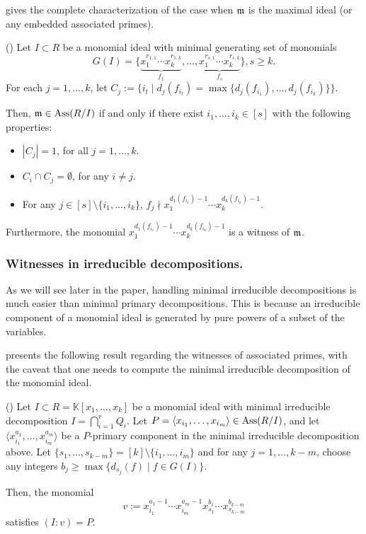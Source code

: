 \documentclass[11pt]{amsart}   %
\begin{document}
\cite[Theorem 2.7 and proof of Theorem 2.3]{NaRa} gives the complete characterization of the case when $\frak m$ is the maximal ideal (or any embedded associated primes).        

\begin{thm}\label{thm_M_assoc} {\rm (\cite[Theorem 2.7, proof of Theorem 2.3]{NaRa})} Let $I\subset R$ be a monomial ideal with minimal generating set of monomials $$G(I)=\{\underbrace{x_1^{r_{1,1}}\cdots x_k^{r_{1,k}}}_{f_1},\ldots,\underbrace{x_1^{r_{s,1}}\cdots x_k^{r_{s,k}}}_{f_s}\}, s\geq k.$$ For each $j=1,\ldots,k$, let $C_j:=\{i_t\mid d_j(f_{i_t})=\max\{d_j(f_{i_1}),\ldots,d_j(f_{i_k})\}\}$. 

Then, $\frak{m}\in {\rm Ass}(R/I)$ if and only if there exist $i_1,\ldots,i_k\in [s]$ with the following properties:
\begin{itemize}
\item[(1)] $|C_j|=1$, for all $j=1,\ldots,k$.
\item[(2)] $C_i\cap C_j=\emptyset$, for any $i\neq j$.
\item[(3)] For any $j\in [s]\setminus\{i_1,\ldots,i_k\}$, $f_j\nmid x_1^{d_1(f_{i_1})-1}\cdots x_k^{d_k(f_{i_k})-1}$.
\end{itemize}

Furthermore, the monomial $x_1^{d_1(f_{i_1})-1}\cdots x_k^{d_k(f_{i_k})-1}$ is a witness of $\frak m$.    
\end{thm}

\medskip

\subsubsection{Witnesses in irreducible decompositions.} As we will see later in the paper, handling minimal irreducible decompositions is much easier than minimal primary decompositions. This is because an irreducible component of a monomial ideal is generated by pure powers of a subset of the variables.

\cite[Theorem 3.1]{AmSe} presents  the following result regarding the witnesses of associated primes, with the caveat that one needs to compute the minimal irreducible decomposition of the monomial ideal.

\begin{thm}\label{thm_witness_irreducible} {\rm (\cite[Theorem 3.1]{AmSe})} Let $I\subset R=\mathbb K[x_1,\ldots,x_k]$ be a monomial ideal with minimal irreducible decomposition $\displaystyle I=\bigcap_{i=1}^rQ_i$. Let $P=\langle x_{i_1},\ldots,x_{i_m}\rangle\in {\rm Ass}(R/I)$, and let $\langle x_{i_1}^{a_1},\ldots,x_{i_m}^{a_m}\rangle$ be a $P$-primary component in the minimal irreducible decomposition above. Let $\{s_1,\ldots,s_{k-m}\}=[k]\setminus\{i_1,\ldots,i_m\}$ and for any $j=1,\ldots,k-m$, choose any integers $b_j\geq \max\{d_{s_j}(f)\mid f\in G(I)\}$.

Then, the monomial $$v:=x_{i_1}^{a_1-1}\cdots x_{i_m}^{a_m-1}x_{s_1}^{b_1}\cdots x_{s_{k-m}}^{b_{k-m}}$$ satisfies $(I:v)=P$.
\end{thm}
\end{document}
